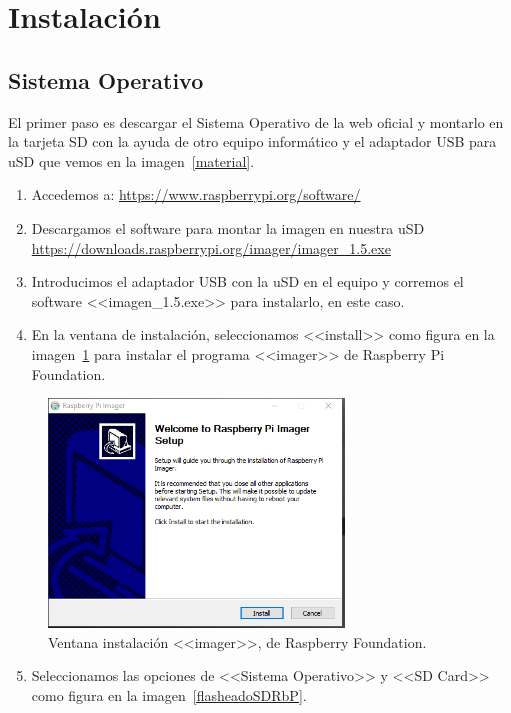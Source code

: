 \section{Instalación}

\subsection{Sistema Operativo}
El primer paso es descargar el Sistema Operativo de la web oficial y montarlo en la tarjeta SD con la ayuda de otro equipo informático y el adaptador USB para uSD que vemos en la imagen~\ref{material}. 

\begin{enumerate}
    \item Accedemos a: \url{https://www.raspberrypi.org/software/}
    \item Descargamos el software para montar la imagen en nuestra uSD \url{https://downloads.raspberrypi.org/imager/imager_1.5.exe}
    \item Introducimos el adaptador USB con la uSD en el equipo y corremos el software <<imagen\_1.5.exe>> para instalarlo, en este caso.
    \item En la ventana de instalación, seleccionamos <<install>> como figura en la imagen~\ref{instalacionRaspbian} para instalar el programa <<imager>> de Raspberry Pi Foundation.
\end{enumerate}

\begin{figure}[h]
\centering
\includegraphics[width=0.7\textwidth]{img/fotos/instalacionRaspbian.PNG}
\caption{Ventana instalación <<imager>>, de Raspberry Foundation.}\label{instalacionRaspbian}
\end{figure}

\begin{enumerate}
\setcounter{enumi}{4}
    \item Seleccionamos las opciones de <<Sistema Operativo>> y <<SD Card>> como figura en la imagen~\ref{flasheadoSDRbP}.
\end{enumerate}

